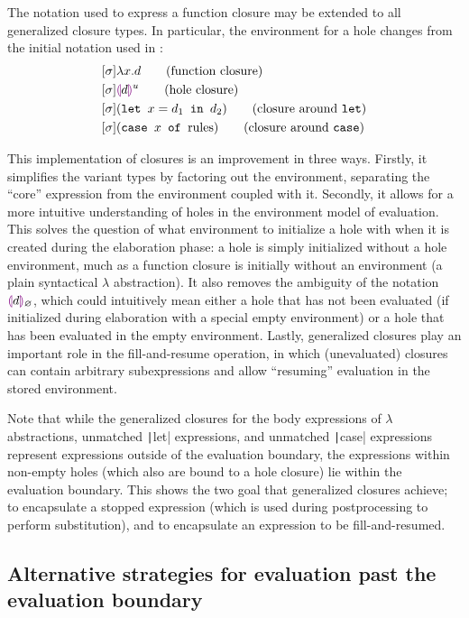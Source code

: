 The notation used to express a function closure may be extended to all generalized closure types. In particular, the environment for a hole changes from the initial notation used in \cite{conf/popl/HazelnutLive19}:
\begin{align}
  \label{eq:generalized-closure-notation}
  &[\env]\lambda x.d\tag{function closure} \\
  &[\env]\hhole{d}^u\tag{hole closure} \\
  &[\env](\texttt{let }x=d_1\texttt{ in }d_2)\tag{closure around \texttt{let}} \\
  &[\env](\texttt{case }x\texttt{ of }\text{rules})\tag{closure around \texttt{case}}
\end{align}

This implementation of closures is an improvement in three ways. Firstly, it simplifies the variant types by factoring out the environment, separating the ``core'' expression from the environment coupled with it. Secondly, it allows for a more intuitive understanding of holes in the environment model of evaluation. This solves the question of what environment to initialize a hole with when it is created during the elaboration phase: a hole is simply initialized without a hole environment, much as a function closure is initially without an environment (a plain syntactical $\lambda$ abstraction). It also removes the ambiguity of the notation $\textcolor{violet}{\llparenthesis} d\textcolor{violet}{\rrparenthesis}_\varnothing$, which could intuitively mean either a hole that has not been evaluated (if initialized during elaboration with a special empty environment) or a hole that has been evaluated in the empty environment. Lastly, generalized closures play an important role in the fill-and-resume operation, in which (unevaluated) closures can contain arbitrary subexpressions and allow ``resuming'' evaluation in the stored environment.

Note that while the generalized closures for the body expressions of $\lambda$ abstractions, unmatched \texttt|let| expressions, and unmatched \texttt|case| expressions represent expressions outside of the evaluation boundary, the expressions within non-empty holes (which also are bound to a hole closure) lie within the evaluation boundary. This shows the two goal that generalized closures achieve; to encapsulate a stopped expression (which is used during postprocessing to perform substitution), and to encapsulate an expression to be fill-and-resumed.

\subsection{Alternative strategies for evaluation past the \\ evaluation boundary}
\label{sec:alt_strat_unevaluated}

